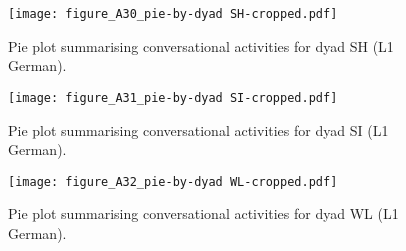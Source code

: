 \begin{figure}
\texttt{[image: figure\_A30\_pie-by-dyad SH-cropped.pdf]}
\caption{\label{fig:A30} Pie plot summarising conversational activities for dyad SH (L1 German).}
\end{figure}

\begin{figure}
\texttt{[image: figure\_A31\_pie-by-dyad SI-cropped.pdf]}
\caption{\label{fig:A31} Pie plot summarising conversational activities for dyad SI (L1 German).}
\end{figure}

\begin{figure}
\texttt{[image: figure\_A32\_pie-by-dyad WL-cropped.pdf]}
\caption{\label{fig:A32} Pie plot summarising conversational activities for dyad WL (L1 German).}
\end{figure}
\cleardoublepage
